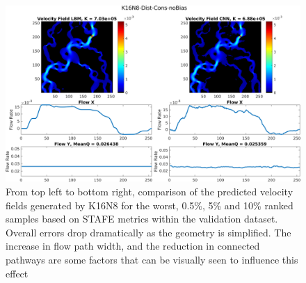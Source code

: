 \documentclass{article}
\begin{document}
\begin{figure}[htp!]
\begin{minipage}[b]{0.49\textwidth}
  \end{minipage}
  \hfill
  \begin{minipage}[b]{0.49\textwidth}
    \includegraphics[width=\textwidth]{figures/velCNNs436-6.png}
  \end{minipage}
    \caption{From top left to bottom right, comparison of the predicted velocity fields generated by K16N8 for the worst, 0.5\%, 5\% and 10\% ranked samples based on STAFE metrics within the validation dataset. Overall errors drop dramatically as the geometry is simplified. The increase in flow path width, and the reduction in connected pathways are some factors that can be visually seen to influence this effect}
    \label{fig:velComparek16n8bin}
\end{figure}
\end{document}

